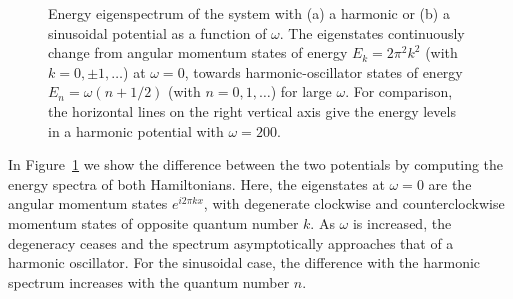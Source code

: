 \begin{figure}
\centering
{}

\caption{ Energy eigenspectrum of the system with (a) a harmonic or (b) a sinusoidal potential as a function of $\omega$. 
The eigenstates continuously change from angular momentum states of energy $E_k=2\pi^2 k^2$ (with $k=0,\pm1,\ldots$) at $\omega=0$, towards harmonic-oscillator states of energy $E_n=\omega(n+1/2)$ (with $n=0,1,\ldots$) for large $\omega$.
For comparison, the horizontal lines on the right vertical axis give the energy levels in a harmonic potential with $\omega=200$.}
\label{fig:spectrum}
\end{figure}

In Figure~\ref{fig:spectrum} we show the difference between the two potentials by computing the energy spectra of both Hamiltonians.
Here, the eigenstates at $\omega=0$ are the angular momentum states $e^{i 2 \pi k x}$, with degenerate clockwise and counterclockwise momentum states of opposite quantum number $k$.
As $\omega$ is increased, the degeneracy ceases and the spectrum asymptotically approaches that of a harmonic oscillator.
For the sinusoidal case, the difference with the harmonic spectrum increases with the quantum number $n$.

